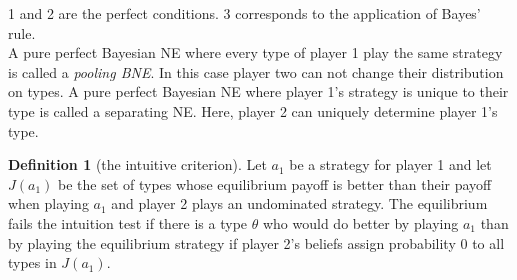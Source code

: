 \documentclass[a4paper, 12pt]{article}
\theoremstyle{plain}
\theoremstyle{definition}
\newtheorem{definition}[theorem]{Definition} %
\theoremstyle{lemma}
\theoremstyle{remark}
\theoremstyle{corollary}
\theoremstyle{example}
\begin{document}
	1 and 2 are the perfect conditions. 3 corresponds to the application of Bayes' rule.\\
	A pure perfect Bayesian NE where every type of player 1 play the same strategy is called a \textit{pooling BNE}. In this case player two can not change their distribution on types. A pure perfect Bayesian NE where player 1's strategy is unique to their type is called a separating NE. Here, player 2 can uniquely determine player 1's type.
	\begin{definition}[the intuitive criterion]
		Let $a_1$ be a strategy for player 1 and let $J(a_1)$ be the set of types whose equilibrium payoff is better than their payoff when playing $a_1$ and player 2 plays an undominated strategy. The equilibrium fails the intuition test if there is a type $\theta$ who would do better by playing $a_1$ than by playing the equilibrium strategy if player 2's beliefs assign probability 0 to all types in $J(a_1)$.
	\end{definition}
\end{document}
